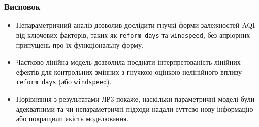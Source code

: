 ﻿\documentclass{beamer}
\begin{document}
\begin{frame}
  \frametitle{Висновок}

  \begin{itemize}
    \item Непараметричний аналіз дозволив дослідити гнучкі форми залежностей AQI від ключових факторів, таких як \texttt{reform\_days} та \texttt{windspeed}, без апріорних припущень про їх функціональну форму.
    \item Частково-лінійна модель дозволила поєднати інтерпретованість лінійних ефектів для контрольних змінних з гнучкою оцінкою нелінійного впливу \texttt{reform\_days} (або \texttt{windspeed}).
    \item Порівняння з результатами ЛР3 покаже, наскільки параметричні моделі були адекватними та чи непараметричні підходи надали суттєво нову інформацію або покращили якість моделювання.
  \end{itemize}

\end{frame}
\end{document}
